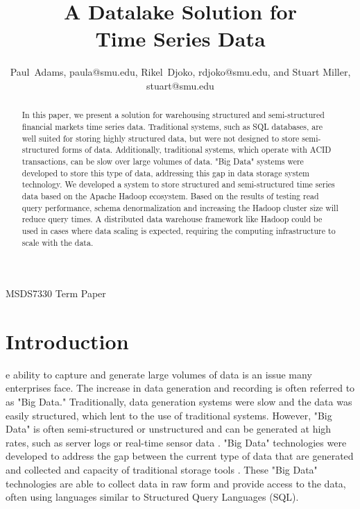 \documentclass[journal]{IEEEtran}
\begin{document}
\title{A Datalake Solution for\\ 
       Time Series Data}

\author{Paul~Adams, paula@smu.edu,
        Rikel~Djoko, rdjoko@smu.edu,
        and Stuart Miller, stuart@smu.edu}

{MSDS7330 Term Paper}

\maketitle

\begin{abstract}

In this paper, we present a solution for warehousing structured and semi-structured 
financial markets time series data.
Traditional systems, such as SQL databases, are well suited for storing highly structured data,
 but were not designed to store semi-structured forms of data.
Additionally, traditional systems, which operate with ACID transactions,
 can be slow over large volumes of data.
"Big Data" systems were developed to store this type of data,
 addressing this gap in data storage system technology.
We developed a system to store structured and semi-structured time series data based on the 
 Apache Hadoop ecosystem.
Based on the results of testing read query performance,
 schema denormalization and increasing the Hadoop cluster size will reduce query times.
A distributed data warehouse framework like Hadoop could be used in cases where data scaling is expected,
 requiring the computing infrastructure to scale with the data.

\end{abstract}

\section{Introduction}


e ability to capture and generate large volumes of data is an issue
 many enterprises face.
The increase in data generation and recording is often referred to as "Big Data."
Traditionally, data generation systems were slow and the data was easily structured, 
 which lent to the use of traditional systems.
However, "Big Data" is often semi-structured or unstructured and
 can be generated at high rates,
  such as server logs or real-time sensor data \cite{Intel}.
"Big Data" technologies were developed to address the gap between the current type of data
 that are generated and collected and capacity of traditional storage tools \cite{BigDataComputing}.
These "Big Data" technologies are able to collect data in raw form and
provide access to the data, often using languages similar to Structured Query Languages (SQL).
\end{document}
